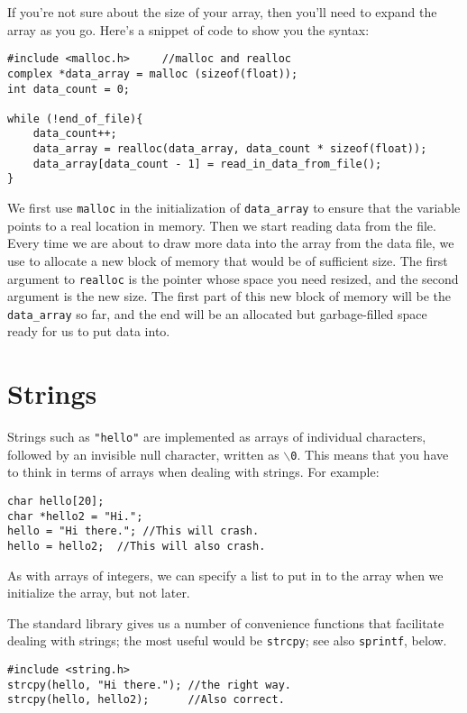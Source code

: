 \documentclass[12pt]{article}
\makeatletter
\def\ttind#1{\index{#1@{\tt #1}}{\tt #1}}
\makeatother
\begin{document}
If you're not sure about the size of your array, then you'll need to
expand the array as you go. Here's a snippet of code to show you the syntax:
\begin{verbatim}
#include <malloc.h>     //malloc and realloc
complex *data_array = malloc (sizeof(float));
int data_count = 0;

while (!end_of_file){
    data_count++;
    data_array = realloc(data_array, data_count * sizeof(float));
    data_array[data_count - 1] = read_in_data_from_file();
}
\end{verbatim}

We first use {\tt malloc} in the initialization of {\tt data\_array}
to ensure that the variable points to a real location in memory. Then
we start reading data from the file. Every time we are about to draw
more data into the array from the data file, we use \ttind{realloc} to
allocate a new block of memory that would be of sufficient size. The first
argument to {\tt realloc} is the pointer whose space you need resized,
and the second argument is the new size.  The first part of this new
block of memory will be the {\tt data\_array} so far, and the end will
be an allocated but garbage-filled space ready for us to put data into.

\section{Strings} 

Strings such as {\tt "hello"} are implemented as arrays of individual characters, followed by an invisible
null character, written as {\tt $\backslash$0}. This means that you have to think in terms of arrays when dealing
with strings. For example:
\begin{verbatim}
char hello[20];
char *hello2 = "Hi.";
hello = "Hi there."; //This will crash.
hello = hello2;  //This will also crash.
\end{verbatim}

As with arrays of integers, we can specify a list to put in to the array when we initialize the array, but
not later.

The standard library gives us a number of convenience functions that facilitate dealing with strings; the
most useful would be {\tt strcpy}; see also {\tt sprintf}, below.
\begin{verbatim}
#include <string.h>
strcpy(hello, "Hi there."); //the right way.
strcpy(hello, hello2);      //Also correct.
\end{verbatim}
\end{document}
